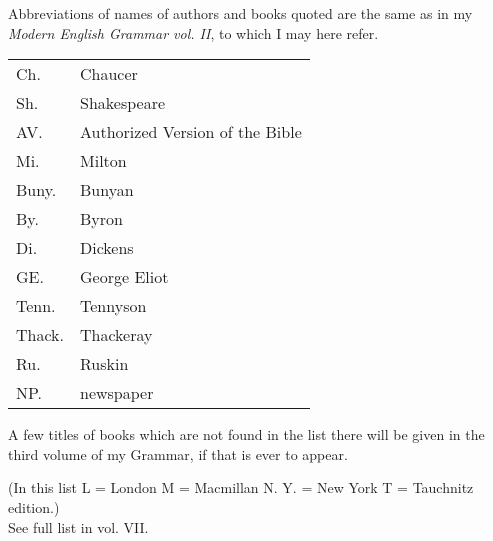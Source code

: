\addchap{\lsAbbreviationsTitle}

Abbreviations of names of authors and books quoted are the same as in my \textit{Modern English Grammar vol. II}, to which I may here refer. 

\phantom{a}

\begin{tabular}{ll}
Ch. & Chaucer\\
Sh. & Shakespeare\\
AV. & Authorized Version of the Bible\\
Mi. & Milton\\
Buny. & Bunyan\\
By. & Byron\\
Di. & Dickens\\
GE. & George Eliot\\
Tenn. & Tennyson\\
Thack. & Thackeray\\
Ru. & Ruskin\\
NP. & newspaper
\end{tabular}

\phantom{a}

\noindent A few titles of books which are not found in the list there will be given in the third volume of
my Grammar, if that is ever to appear.


(In this list L = London M = Macmillan N. Y. = New York T = Tauchnitz edition.) \\
See full list in vol. VII.

